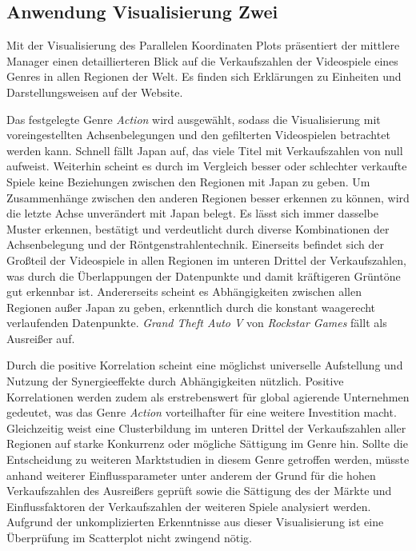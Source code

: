 \documentclass[usegeometry=true]{scrartcl}
\begin{document}
\subsection{Anwendung Visualisierung Zwei}
Mit der Visualisierung des Parallelen Koordinaten Plots präsentiert der mittlere Manager einen detaillierteren Blick auf die Verkaufszahlen der Videospiele eines Genres in allen Regionen der Welt.
Es finden sich Erklärungen zu Einheiten und Darstellungsweisen auf der Website.

Das festgelegte Genre \textit{Action} wird ausgewählt, sodass die Visualisierung mit voreingestellten Achsenbelegungen 
und den gefilterten Videospielen betrachtet werden kann. 
Schnell fällt Japan auf, das viele Titel mit Verkaufszahlen von null aufweist. 
Weiterhin scheint es durch im Vergleich besser oder schlechter verkaufte Spiele keine Beziehungen zwischen den Regionen mit Japan zu geben.
Um Zusammenhänge zwischen den anderen Regionen besser erkennen zu können, wird die letzte Achse unverändert mit Japan belegt.
Es lässt sich immer dasselbe Muster erkennen, bestätigt und verdeutlicht durch diverse Kombinationen der Achsenbelegung und der Röntgenstrahlentechnik.
Einerseits befindet sich der Großteil der Videospiele in allen Regionen im unteren Drittel der Verkaufszahlen, was durch die Überlappungen der Datenpunkte und damit kräftigeren Grüntöne gut erkennbar ist.
Andererseits scheint es Abhängigkeiten zwischen allen Regionen außer Japan zu geben, erkenntlich durch die konstant waagerecht verlaufenden Datenpunkte.
\textit{Grand Theft Auto V} von \textit{Rockstar Games} fällt als Ausreißer auf. 

Durch die positive Korrelation scheint eine möglichst universelle Aufstellung und Nutzung der Synergieeffekte durch Abhängigkeiten nützlich.
Positive Korrelationen werden zudem als erstrebenswert für global agierende Unternehmen gedeutet, was das Genre \textit{Action} vorteilhafter für eine weitere Investition macht.
Gleichzeitig weist eine Clusterbildung im unteren Drittel der Verkaufszahlen aller Regionen auf starke Konkurrenz oder mögliche Sättigung im Genre hin. 
Sollte die Entscheidung zu weiteren Marktstudien in diesem Genre getroffen werden, 
müsste anhand weiterer Einflussparameter unter anderem der Grund für die hohen Verkaufszahlen des Ausreißers geprüft sowie die Sättigung des der Märkte und Einflussfaktoren der Verkaufszahlen der weiteren Spiele analysiert werden.
Aufgrund der unkomplizierten Erkenntnisse aus dieser Visualisierung ist eine Überprüfung im Scatterplot nicht zwingend nötig.
\end{document}
